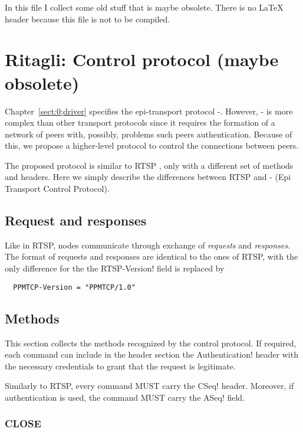 In this file I collect some old stuff that is maybe obsolete. There is
no LaTeX header because this file is not to be compiled.

\chapter{Ritagli: Control protocol (maybe obsolete)}
\label{sect:2;driver}

Chapter~\ref{sect:0;driver} specifies the epi-transport protocol
\ppetp-.  However, \ppetp- is more complex than other transport
protocols since it requires the formation of a network of peers with,
possibly, problems such peers authentication.  Because of this, we
propose a higher-level protocol to control the connections between
peers.

The proposed protocol is similar to RTSP \cite{rfc2326}, only with a
different set of methods and headers.  Here we simply describe the
differences between RTSP and \ppc- (Epi Transport Control Protocol).

\section{Request and responses}
\label{sect:2.0;driver}

Like in RTSP, nodes communicate through exchange of \emph{requests}
and \emph{responses}.  The format of requests and responses are
identical to the ones of RTSP, with the only difference for the the
\ttt RTSP-Version! field is replaced by
%
\begin{verbatim}
  PPMTCP-Version = "PPMTCP/1.0"
\end{verbatim}

\section{Methods}
\label{sect:2.1;driver}

This section collects the methods recognized by the control protocol.
If required, each command can include in the header section the \ttt
Authentication! header with the necessary credentials to grant that
the request is legitimate.

Similarly to RTSP, every command MUST carry the \ttt CSeq! header.
Moreover, if authentication is used, the command MUST carry the \ttt
ASeq! field. 

\subsection{CLOSE}
\label{subsub:7.0.2;transport_layer}

